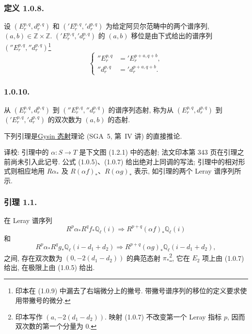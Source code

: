 \subsubsection*{定义 1.0.8.}
设 $(E_r^{p,q},d_r^{p,q})$ 和 $({}'E_r^{p,q},{}'d_r^{p,q})$ 为给定阿贝尔范畴中的两个谱序列, $(a,b)\in\mathbb Z\times\mathbb Z$. $({}'E_r^{p,q},{}'d_r^{p,q})$ 的 $(a,b)$ 移位是由下式给出的谱序列 $({}''E_r^{p,q},{}''d_r^{p,q})$\footnote{印本在 (1.0.9) 中漏去了右端微分上的撇号. 带撇号谱序列的移位的定义要求使用带撇号的微分.}
\begin{equation}\tag{1.0.9}
\left\{
\begin{aligned}
{}''E_r^{p,q}&={}'E_r^{p+a,q+b},\\
{}''d_r^{p,q}&={}'d_r^{p+a,q+b}.
\end{aligned}
\right.
\end{equation}

\subsubsection*{1.0.10.}
从 $(E_r^{p,q},d_r^{p,q})$ 到 $({}''E_r^{p,q},{}''d_r^{p,q})$ 的谱序列态射, 称为从 $(E_r^{p,q},d_r^{p,q})$ 到 $({}'E_r^{p,q},{}'d_r^{p,q})$ 的双次数为 $(a,b)$ 的态射.

下列引理是\underline{Gysin 态射}理论 (SGA~5, 第~IV 讲) 的直接推论.

\begin{editorialnote}
译校: 引理中的 $\alpha:S\to T$ 是下文图 (1.2.1) 中的态射; 法文印本第 343 页在引理之前尚未引入此记号. 公式 (1.0.5)、(1.0.7) 给出绝对上同调的写法; 引理中的相对形式则相应地用 $R\alpha_*$ 及 $R(\alpha f)_*$、$R(\alpha g)_*$ 表示, 如引理的两个 Leray 谱序列所示.
\end{editorialnote}

\subsubsection*{引理 1.1.}
在 Leray 谱序列
\begin{equation}\tag{1.1.0}
R^p\alpha_*R^qf_*\mathbb Q_\ell(i)\Longrightarrow
R^{p+q}(\alpha f)_*\mathbb Q_\ell(i)
\end{equation}
和
\begin{equation}\tag{1.1.1}
R^p\alpha_*R^qg_*\mathbb Q_\ell(i-d_1+d_2)\Longrightarrow
R^{p+q}(\alpha g)_*\mathbb Q_\ell(i-d_1+d_2),
\end{equation}
之间, 存在双次数为 $(0,-2(d_1-d_2))$ 的典范态射 $\pi_*$\footnote{印本写作 $(a,-2(d_1-d_2))$. 映射 (1.0.7) 不改变第一个 Leray 指标 $p$, 因而双次数的第一个分量为 $0$.}, 它在 $E_2$ 项上由 (1.0.7) 给出, 在极限上由 (1.0.5) 给出.

